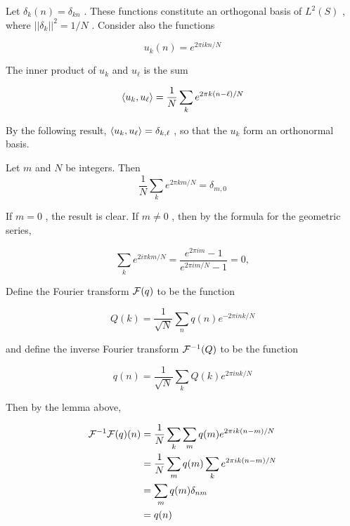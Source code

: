 Let   $\delta_k(n) = \delta_{kn}$ .   These  functions  constitute  an  orthogonal  basis  of   $L^2(S)$ ,  where   $||\delta_k||^2 = 1/N$ .   Consider  also  the  functions



\begin{equation}
u_k(n) = e^{2\pi i kn/N}
\end{equation}


The  inner  product  of   $u_k$  and   $u_\ell$  is  the  sum



\begin{equation}
\langle u_k, u_\ell \rangle 
 =
\frac{1}{N}\sum_k e^{2\pi k(n-\ell)/N}
\end{equation}


By  the  following  result,   $\langle u_k, u_\ell \rangle = \delta_{k, \ell}$ ,  so  that  the   $u_k$  form  an  orthonormal  basis.



\begin{lemma}
Let   $m$  and   $N$  be  integers.  Then
 $$
\frac{1}{N}\sum_k e^{2\pi km/N} = \delta_{m,0}
$$
\end{lemma}


  If   $m = 0$ ,  the  result  is  clear.   If   $m \ne 0$ ,  then  by  the  formula  for  the  geometric  series,



\begin{equation}
\sum_k e^{2i\pi km/N} = \frac{e^{2\pi im} - 1}{e^{2\pi im/N} - 1} =0,
\end{equation}



Define  the  Fourier  transform   $\mathcal{F}(q)$  to  be  the  function



\begin{equation}
Q(k) = \frac{1}{\sqrt N} \sum_n q(n)e^{-2\pi i nk/N}
\end{equation}


and  define  the  inverse  Fourier  transform   $\mathcal{F}^{-1}(Q)$  to  be  the  function



\begin{equation}
q(n) = \frac{1}{\sqrt N} \sum_k Q(k)e^{2\pi i nk/N}
\end{equation}


Then  by  the  lemma  above,



\begin{align}
\mathcal{F}^{-1}\mathcal{F}(q)(n) &= 
\frac{1}{N} \sum_k \sum_m q(m) e^{2\pi ik(n - m)/N} \\
&=
\frac{1}{N} \sum_m q(m) \sum_k  e^{2\pi ik(n - m)/N} \\
&= \sum_m q(m)\delta_{nm} \\
&= q(n)
\end{align}


